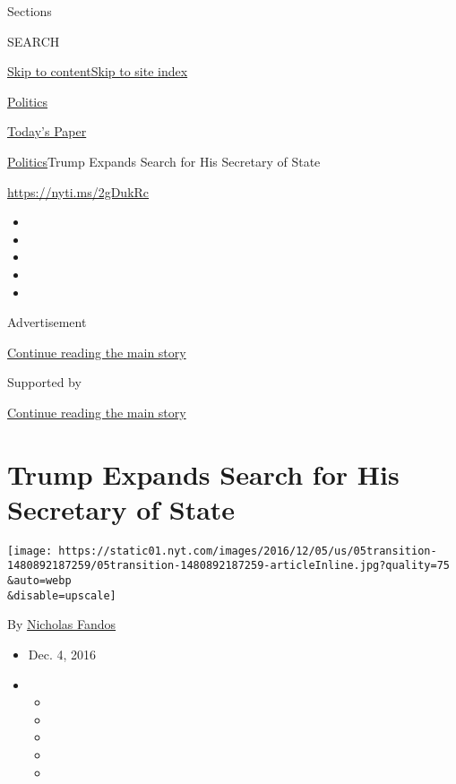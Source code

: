 Sections

SEARCH

\protect\hyperlink{site-content}{Skip to
content}\protect\hyperlink{site-index}{Skip to site index}

\href{https://www.nytimes.com/section/politics}{Politics}

\href{https://myaccount.nytimes.com/auth/login?response_type=cookie\&client_id=vi}{}

\href{https://www.nytimes.com/section/todayspaper}{Today's Paper}

\href{/section/politics}{Politics}\textbar{}Trump Expands Search for His
Secretary of State

\url{https://nyti.ms/2gDukRc}

\begin{itemize}
\item
\item
\item
\item
\item
\end{itemize}

Advertisement

\protect\hyperlink{after-top}{Continue reading the main story}

Supported by

\protect\hyperlink{after-sponsor}{Continue reading the main story}

\hypertarget{trump-expands-search-for-his-secretary-of-state}{%
\section{Trump Expands Search for His Secretary of
State}\label{trump-expands-search-for-his-secretary-of-state}}

\texttt{[image: https://static01.nyt.com/images/2016/12/05/us/05transition-1480892187259/05transition-1480892187259-articleInline.jpg?quality=75\\\&auto=webp\\\&disable=upscale]}

By \href{https://www.nytimes.com/by/nicholas-fandos}{Nicholas Fandos}

\begin{itemize}
\item
  Dec. 4, 2016
\item
  \begin{itemize}
  \item
  \item
  \item
  \item
  \item
  \end{itemize}
\end{itemize}

